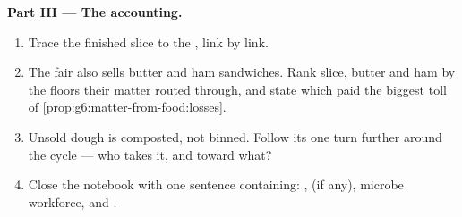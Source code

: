 \begin{problem}
\medskip\noindent\textbf{Part III --- The accounting.}
\begin{enumerate}[resume]
  \item Trace the finished slice to the , link by
        link.
  \item The fair also sells butter and ham sandwiches.
        Rank slice, butter and ham by the floors their
        matter routed through, and state which paid the
        biggest toll of
        \cref{prop:g6:matter-from-food:losses}.
  \item Unsold dough is composted, not binned. Follow its
         one turn further around the cycle
        --- who takes it, and toward what?
  \item Close the notebook with one sentence containing:
        ,  (if any), microbe workforce,
        and .
\end{enumerate}
\end{problem}
